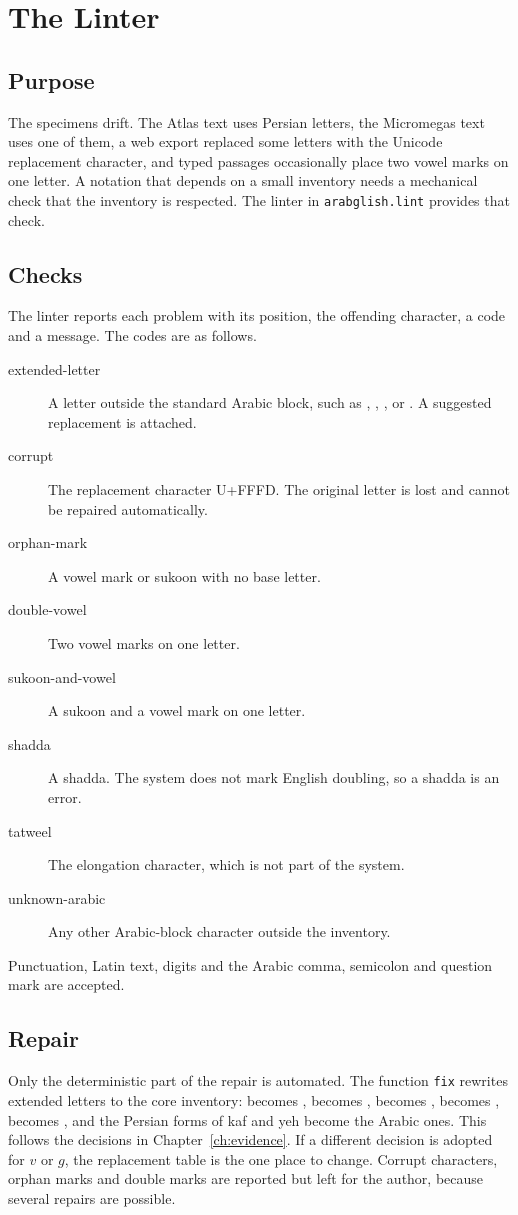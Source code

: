 \chapter{The Linter}

\section{Purpose}
The specimens drift. The Atlas text uses Persian letters, the Micromegas text uses one of them, a web export replaced some letters with the Unicode replacement character, and typed passages occasionally place two vowel marks on one letter. A notation that depends on a small inventory needs a mechanical check that the inventory is respected. The linter in \texttt{arabglish.lint} provides that check.

\section{Checks}
The linter reports each problem with its position, the offending character, a code and a message. The codes are as follows.

\begin{description}
\item[extended-letter] A letter outside the standard Arabic block, such as , , ,  or . A suggested replacement is attached.
\item[corrupt] The replacement character U+FFFD. The original letter is lost and cannot be repaired automatically.
\item[orphan-mark] A vowel mark or sukoon with no base letter.
\item[double-vowel] Two vowel marks on one letter.
\item[sukoon-and-vowel] A sukoon and a vowel mark on one letter.
\item[shadda] A shadda. The system does not mark English doubling, so a shadda is an error.
\item[tatweel] The elongation character, which is not part of the system.
\item[unknown-arabic] Any other Arabic-block character outside the inventory.
\end{description}

Punctuation, Latin text, digits and the Arabic comma, semicolon and question mark are accepted.

\section{Repair}
Only the deterministic part of the repair is automated. The function \texttt{fix} rewrites extended letters to the core inventory:  becomes ,  becomes ,  becomes ,  becomes ,  becomes , and the Persian forms of kaf and yeh become the Arabic ones. This follows the decisions in Chapter~\ref{ch:evidence}. If a different decision is adopted for $v$ or $g$, the replacement table is the one place to change. Corrupt characters, orphan marks and double marks are reported but left for the author, because several repairs are possible.

